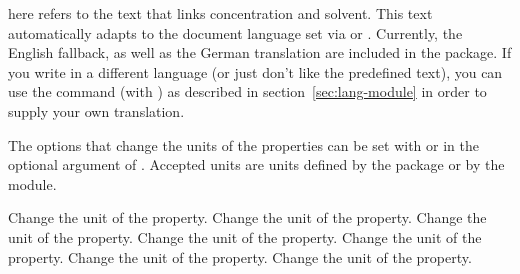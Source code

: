 \documentclass{chemmacros-manual}
\begin{document}
 here refers to the text that links concentration and
solvent. This text automatically adapts to the document language set via
 or .  Currently, the English fallback, as well as
the German translation are included in the package.  If you write in a
different language (or just don't like the predefined text), you can use the
command 
(with ) as described in
section~\vref{sec:lang-module} in order to supply your own translation.

\begin{example}

  \par
  \par
\end{example}

The options that change the units of the properties can be set with
 or in the optional argument of . Accepted units
are units defined by the  package or by the  module.
\begin{options}
    Change the unit of the  property.
    Change the unit of the  property.
    Change the unit of the  property.
    Change the unit of the  property.
    Change the unit of the  property.
    Change the unit of the  property.
    Change the unit of the  property.
\end{options} 

\begin{example}
   \par
\end{example}
\end{document}
